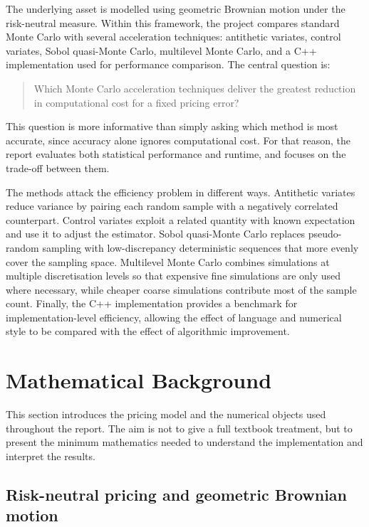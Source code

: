 \documentclass[11pt]{article}
\begin{document}
The underlying asset is modelled using geometric Brownian motion under the risk-neutral measure. Within this framework, the project compares standard Monte Carlo with several acceleration techniques: antithetic variates, control variates, Sobol quasi-Monte Carlo, multilevel Monte Carlo, and a C++ implementation used for performance comparison. The central question is:

\begin{quote}
Which Monte Carlo acceleration techniques deliver the greatest reduction in computational cost for a fixed pricing error?
\end{quote}

This question is more informative than simply asking which method is most accurate, since accuracy alone ignores computational cost. For that reason, the report evaluates both statistical performance and runtime, and focuses on the trade-off between them.

The methods attack the efficiency problem in different ways. Antithetic variates reduce variance by pairing each random sample with a negatively correlated counterpart. Control variates exploit a related quantity with known expectation and use it to adjust the estimator. Sobol quasi-Monte Carlo replaces pseudo-random sampling with low-discrepancy deterministic sequences that more evenly cover the sampling space. Multilevel Monte Carlo combines simulations at multiple discretisation levels so that expensive fine simulations are only used where necessary, while cheaper coarse simulations contribute most of the sample count. Finally, the C++ implementation provides a benchmark for implementation-level efficiency, allowing the effect of language and numerical style to be compared with the effect of algorithmic improvement.

\section{Mathematical Background}

This section introduces the pricing model and the numerical objects used throughout the report. The aim is not to give a full textbook treatment, but to present the minimum mathematics needed to understand the implementation and interpret the results.

\subsection{Risk-neutral pricing and geometric Brownian motion}
\end{document}
